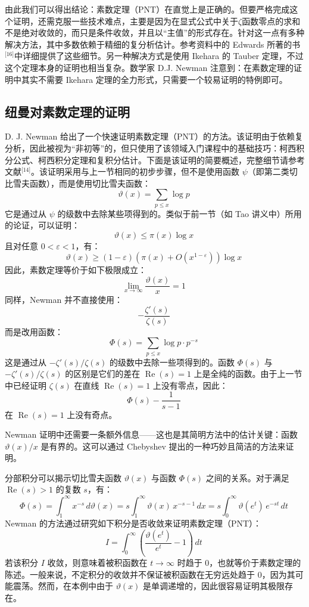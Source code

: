 由此我们可以得出结论：素数定理（PNT）在直觉上是正确的。但要严格完成这个证明，还需克服一些技术难点，主要是因为在显式公式中关于$\zeta$函数零点的求和不是绝对收敛的，而只是条件收敛，并且以“主值”的形式存在。针对这一点有多种解决方法，其中多数依赖于精细的复分析估计。参考资料中的 Edwards 所著的书\(^\text{[16]}\)中详细提供了这些细节。另一种解决方式是使用 Ikehara 的 Tauber 定理，不过这个定理本身的证明也相当复杂。数学家 D.J. Newman 注意到：在素数定理的证明中其实不需要 Ikehara 定理的全力形式，只需要一个较易证明的特例即可。
\subsection{纽曼对素数定理的证明}
D. J. Newman 给出了一个快速证明素数定理（PNT）的方法。该证明由于依赖复分析，因此被视为“非初等”的，但只使用了该领域入门课程中的基础技巧：柯西积分公式、柯西积分定理和复积分估计。下面是该证明的简要概述，完整细节请参考文献\(^\text{[14]}\)。该证明采用与上一节相同的初步步骤，但不是使用函数 $\psi$（即第二类切比雪夫函数），而是使用切比雪夫函数：
$$
\vartheta(x) = \sum_{p \leq x} \log p~
$$
它是通过从 $\psi$ 的级数中去除某些项得到的。类似于前一节（如 Tao 讲义中）所用的论证，可以证明：
$$
\vartheta(x) \leq \pi(x) \log x~
$$
且对任意 $0 < \varepsilon < 1$，有：
$$
\vartheta(x) \geq (1 - \varepsilon)\left(\pi(x) + O(x^{1 - \varepsilon})\right) \log x~
$$
因此，素数定理等价于如下极限成立：
$$
\lim_{x \to \infty} \frac{\vartheta(x)}{x} = 1~
$$
同样，Newman 并不直接使用：
$$
-\frac{\zeta'(s)}{\zeta(s)}~
$$
而是改用函数：
$$
\Phi(s) = \sum_{p \leq x} \log p \cdot p^{-s}~
$$
这是通过从 $-\zeta'(s)/\zeta(s)$ 的级数中去除一些项得到的。函数 $\Phi(s)$ 与 $-\zeta'(s)/\zeta(s)$ 的区别是它们的差在 $\operatorname{Re}(s) = 1$ 上是全纯的函数。由于上一节中已经证明 $\zeta(s)$ 在直线 $\operatorname{Re}(s) = 1$ 上没有零点，因此：
$$
\Phi(s) - \frac{1}{s - 1}~
$$
在 $\operatorname{Re}(s) = 1$ 上没有奇点。

Newman 证明中还需要一条额外信息——这也是其简明方法中的估计关键：函数 $\vartheta(x)/x$ 是有界的。这可以通过 Chebyshev 提出的一种巧妙且简洁的方法来证明。

分部积分可以揭示切比雪夫函数 $\vartheta(x)$ 与函数 $\Phi(s)$ 之间的关系。对于满足 $\operatorname{Re}(s) > 1$ 的复数 $s$，有：
$$
\Phi(s) = \int_{1}^{\infty} x^{-s} \, d\vartheta(x) = s \int_{1}^{\infty} \vartheta(x)\, x^{-s-1} \, dx = s \int_{0}^{\infty} \vartheta(e^{t})\, e^{-st} \, dt~
$$
Newman 的方法通过研究如下积分是否收敛来证明素数定理（PNT）：
$$
I = \int_{0}^{\infty} \left( \frac{\vartheta(e^{t})}{e^{t}} - 1 \right) \, dt~
$$
若该积分 $I$ 收敛，则意味着被积函数在 $t \to \infty$ 时趋于 0，也就等价于素数定理的陈述。一般来说，不定积分的收敛并不保证被积函数在无穷远处趋于 0，因为其可能震荡。然而，在本例中由于 $\vartheta(x)$ 是单调递增的，因此很容易证明其极限存在。

